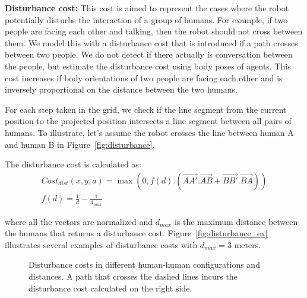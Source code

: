 \documentclass[12pt]{gatech-thesis}
\begin{document}
\textbf{Disturbance cost:} This cost is aimed to represent the cases where the robot potentially disturbs the interaction of a group of humans. For example, if two people are facing each other and talking, then the robot should not cross between them.  We model this with a disturbance cost that is introduced if a path crosses between two people. We do not detect if there actually is conversation between the people, but estimate the disturbance cost using body poses of agents. This cost increases if body orientations of two people are facing each other and is inversely proportional on the distance between the two humans.

For each step taken in the grid, we check if the line segment from the current position to the  projected position intersects a line segment between all pairs of humans. To illustrate, let's assume the robot crosses the line between human A and human B in Figure~\ref{fig:disturbance}. 

The disturbance cost is calculated as:
\begin{equation*} 
\begin{split} 
Cost_{dist}(x,y,a)=\max(0, f(d).(\vec{AA'}.\vec{AB}+\vec{BB'}.\vec{BA})) \\
f(d) = \frac{1}{d}-\frac{1}{d_{max}}
\end{split} 
\end{equation*}

where all the vectors are normalized and $d_{max}$ is the maximum distance between the humans that returns a disturbance cost. Figure~\ref{fig:disturbance_ex} illustrates several examples of disturbance costs with $d_{max}=3$ meters.

\begin{figure}[ht!]
\centering
%
    \caption{%
	Disturbance costs in different human-human configurations and distances. A path that crosses the dashed lines incurs the disturbance cost calculated on the right side.
     }%
   \label{fig:sim}
   \vspace{-0.2cm}
\end{figure}
\end{document}
